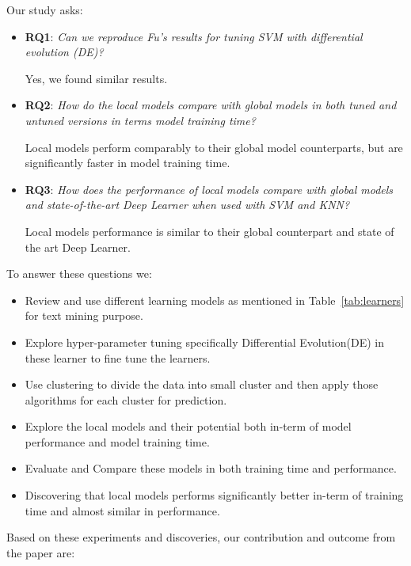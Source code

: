 \documentclass[sigconf]{acmart}
\theoremstyle{break}
\begin{document}
    Our study asks:
    \begin{itemize}
        \item 
            \textbf{RQ1}:  {\em Can we reproduce Fu's results for tuning SVM with differential evolution (DE)?} 
            \begin{lesson}
                Yes, we found similar results.
            \end{lesson}
        \item 
            \textbf{RQ2}: {\em   How do the local models compare with global models in both tuned and untuned versions in terms model training time?} 
            \begin{lesson}
                Local models perform comparably to their global model counterparts, but are significantly faster in model training time.
            \end{lesson}
        \item 
            \textbf{RQ3}: {\em   How does the performance of local models compare with global models and state-of-the-art Deep Learner when used with SVM and KNN?} 
            \begin{lesson}  
                Local models performance is similar to their global counterpart and state of the art Deep Learner.
            \end{lesson}
    \end{itemize}
  To answer these questions we:
    \begin{itemize}
        \item Review and use different learning models as mentioned in Table~\ref{tab:learners} for text mining purpose.
        \item Explore hyper-parameter tuning specifically Differential Evolution(DE) in these learner to fine tune the learners.
        \item Use clustering to divide the data into small cluster and then apply those algorithms for each cluster for prediction.
        \item Explore the local models and their potential both in-term of model performance and model training time.
        \item Evaluate and Compare these models in both training time and performance.
        \item Discovering that local models performs significantly better in-term of training time and almost similar in performance.
    \end{itemize}
    Based on these experiments and discoveries, our contribution and outcome from the paper are:
\end{document}
